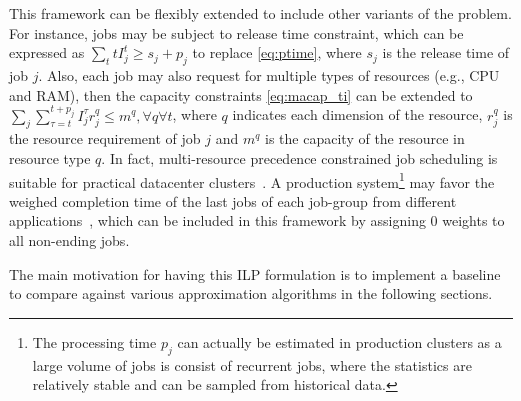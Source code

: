 This framework can be flexibly extended to include other variants of the problem. For instance, jobs may be subject to release time constraint, which can be expressed as $\sum_t tI^t_j \geq s_j + p_j$ to replace \eqref{eq:ptime}, where $s_j$ is the release time of job $j$. Also, each job may also request for multiple types of resources (e.g., CPU and RAM), then the capacity constraints \eqref{eq:macap_ti} can be extended to $\sum_{j} \sum_{\tau=t}^{t + p_j} I^\tau_j r^q_j \leq m^q, \forall q\forall t$, where $q$ indicates each dimension of the resource, $r^q_j$ is the resource requirement of job $j$ and $m^q$ is the capacity of the resource in resource type $q$. In fact, multi-resource precedence constrained job scheduling is suitable for practical datacenter clusters~\cite{graphene}. A production system\footnote{The processing time $p_j$ can actually be estimated in production clusters as a large volume of jobs is consist of recurrent jobs, where the statistics are relatively stable and can be sampled from historical data.} may favor the weighed completion time of the last jobs of each job-group from different applications~\cite{tetris}, which can be included in this framework by assigning $0$ weights to all non-ending jobs.

The main motivation for having this ILP formulation is to implement a baseline to compare against various approximation algorithms in the following sections. 
